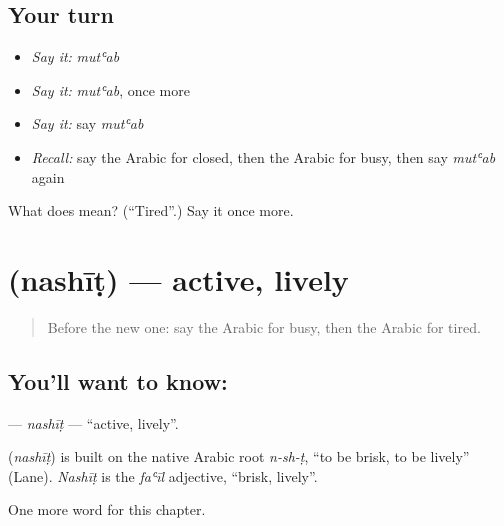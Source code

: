 \subsection*{Your turn}
\begin{itemize}
\raggedright
  \item \emph{Say it:} \emph{mutʿab}
  \item \emph{Say it:} \emph{mutʿab}, once more
  \item \emph{Say it:} say \emph{mutʿab}
  \item \emph{Recall:} say the Arabic for closed, then the Arabic for busy, then say \emph{mutʿab} again
\end{itemize}

\begin{tcolorbox}[breakable,colback=teal!4,colframe=teal!35!black,title={Before you move on}]
What does  mean? (\textquotedblleft{}Tired\textquotedblright{}.) Say it once more.
\end{tcolorbox}
\section[\texorpdfstring{\ar{نشيط} (nashīṭ)}{نشيط (nashīṭ)}]{ (nashīṭ) — active, lively}

\label{lesson:AR-C147-nashit}



\begin{quote}
Before the new one: say the Arabic for busy, then the Arabic for tired.
\end{quote}

\subsection*{You'll want to know: }
\textbf{} — \emph{nashīṭ} — \textquotedblleft{}active, lively\textquotedblright{}.

\begin{cousinweb}
\textbf{} (\emph{nashīṭ}) is built on the native Arabic root \emph{n-sh-ṭ}, \textquotedblleft{}to be brisk, to be lively\textquotedblright{} (Lane). \emph{Nashīṭ} is the \emph{faʿīl} adjective, \textquotedblleft{}brisk, lively\textquotedblright{}.
\end{cousinweb}

\begin{grammarlens}[title={What you've built}]
One more word for this chapter.
\end{grammarlens}

